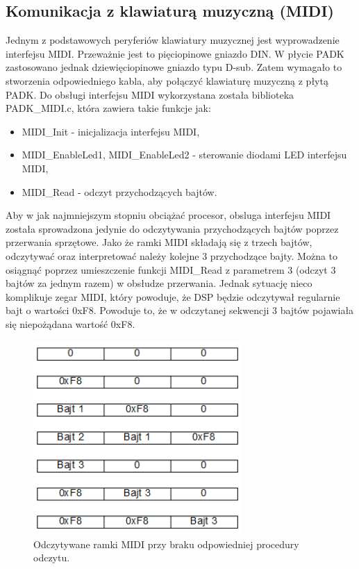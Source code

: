 \subsection{Komunikacja z klawiaturą muzyczną  (MIDI)}
Jednym z podstawowych peryferiów klawiatury muzycznej jest wyprowadzenie interfejsu MIDI. Przeważnie jest to pięciopinowe gniazdo DIN. W płycie PADK zastosowano jednak dziewięciopinowe gniazdo typu D-sub. Zatem wymagało to stworzenia odpowiedniego kabla, aby połączyć klawiaturę muzyczną z płytą PADK.
Do obsługi interfejsu MIDI wykorzystana została biblioteka PADK\_MIDI.c, która zawiera takie funkcje jak:
\begin{itemize}
	\item MIDI\_Init - inicjalizacja interfejsu MIDI,
	\item MIDI\_EnableLed1, MIDI\_EnableLed2 - sterowanie diodami LED interfejsu MIDI,
	\item MIDI\_Read - odczyt przychodzących bajtów. 
\end{itemize}
Aby w jak najmniejszym stopniu obciążać procesor, obsluga interfejsu MIDI została sprowadzona jedynie do odczytywania przychodzących bajtów poprzez przerwania sprzętowe.
Jako że ramki MIDI składają się z trzech bajtów, odczytywać oraz interpretować należy kolejne 3 przychodzące bajty.
Można to osiągnąć poprzez umieszczenie funkcji MIDI\_Read z parametrem 3 (odczyt 3 bajtów za jednym razem) w obsłudze przerwania. Jednak sytuację nieco komplikuje zegar MIDI, który powoduje, że DSP będzie odczytywał regularnie bajt o wartości 0xF8. Powoduje to, że w odczytanej sekwencji 3 bajtów pojawiała się niepożądana wartość 0xF8.
\begin{figure}[H]
	\centering
	\includegraphics[width=8cm]{./grafiki/real_nofifo}
	\captionsetup{justification=centering}
	\caption{Odczytywane ramki MIDI przy braku odpowiedniej procedury odczytu.}
	\label{rys:real_nofifo}
\end{figure} 
